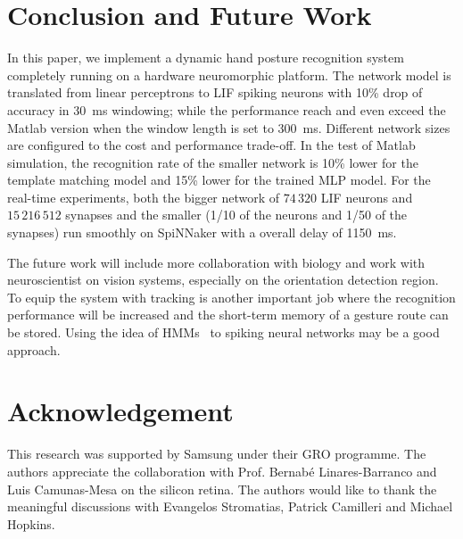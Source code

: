 \documentclass[journal]{journal}
\begin{document}
\section{Conclusion and Future Work}
\label{sec:cfw}
In this paper, we implement a dynamic hand posture recognition system completely running on a hardware neuromorphic platform.
The network model is translated from linear perceptrons to LIF spiking neurons with 10\% drop of accuracy in 30~ms windowing;
while the performance reach and even exceed the Matlab version when the 
window length is set to 300~ms.
Different network sizes are configured to the cost and performance trade-off.
In the test of Matlab simulation, the recognition rate of the smaller network is 10\% lower for the template matching model and 15\% lower for the trained MLP model.
For the real-time experiments, both the bigger network of $74\,320$ LIF neurons and $15\,216\,512$ synapses and the smaller (1/10 of the neurons and 1/50 of the synapses) run smoothly on SpiNNaker with a overall delay of 1150~ms.

The future work will include more collaboration with biology and work with neuroscientist on vision systems, especially on the orientation detection region. 
To equip the system with tracking is another important job where the recognition performance will be increased and the short-term memory of a gesture route can be stored. Using the idea of HMMs~\cite{elmezain2009hidden} to spiking neural networks may be a good approach. 
\section{Acknowledgement}
\label{sec:ack}
This research was supported by Samsung under their GRO programme.
The authors appreciate the collaboration with Prof. Bernab{\'e} Linares-Barranco and Luis Camunas-Mesa on the silicon retina.
The authors would like to thank the meaningful discussions with Evangelos Stromatias, Patrick Camilleri and Michael Hopkins.

\end{document}
